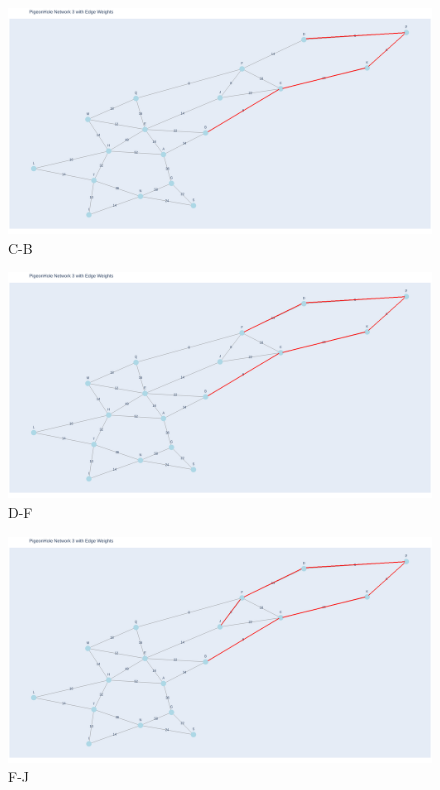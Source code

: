 \documentclass[11pt]{book}
\renewcommand{\=}[1]{\stackrel{#1}{=}} %
\theoremstyle{definition}
\theoremstyle{remark}
\begin{document}
\begin{figure}
    \centering
    \includegraphics[width=1\linewidth]{q5_plots/4.png}
    \caption{C-B}
    \label{fig:enter-label}
\end{figure}
\begin{figure}
    \centering
    \includegraphics[width=1\linewidth]{q5_plots/5.png}
    \caption{D-F}
    \label{fig:enter-label}
\end{figure}
\begin{figure}
    \centering
    \includegraphics[width=1\linewidth]{q5_plots/6.png}
    \caption{F-J}
    \label{fig:enter-label}
\end{figure}
\end{document}
